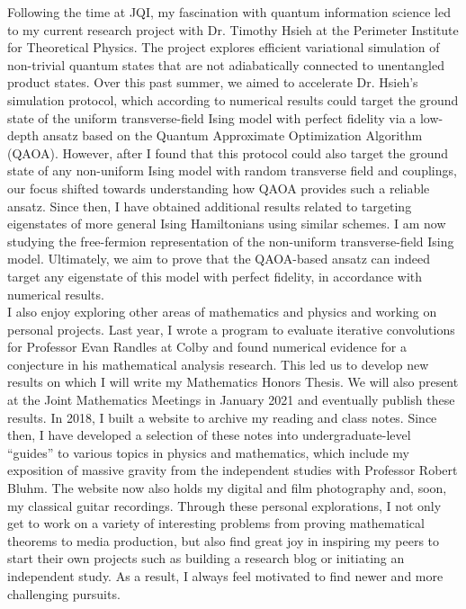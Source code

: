 \documentclass[12pt]{article}
\begin{document}
Following the time at JQI, my fascination with quantum information science led to my current research project with Dr. Timothy Hsieh at the Perimeter Institute for Theoretical Physics. The project explores efficient variational simulation of non-trivial quantum states that are not adiabatically connected to unentangled product states. Over this past summer, we aimed to accelerate Dr. Hsieh's simulation protocol, which according to numerical results could target the ground state of the uniform transverse-field Ising model with perfect fidelity via a low-depth ansatz based on the Quantum Approximate Optimization Algorithm (QAOA). However, after I found that this protocol could also target the ground state of any non-uniform Ising model with random transverse field and couplings, our focus shifted towards understanding how QAOA provides such a reliable ansatz. Since then, I have obtained additional results related to targeting eigenstates of more general Ising Hamiltonians using similar schemes. I am now studying the free-fermion representation of the non-uniform transverse-field Ising model. Ultimately, we aim to prove that the QAOA-based ansatz can indeed target any eigenstate of this model with perfect fidelity, in accordance with numerical results.  \\

I also enjoy exploring other areas of mathematics and physics and working on personal projects. Last year, I wrote a program to evaluate iterative convolutions for Professor Evan Randles at Colby and found numerical evidence for a conjecture in his mathematical analysis research. This led us to develop new results on which I will write my Mathematics Honors Thesis. We will also present at the Joint Mathematics Meetings in January 2021 and eventually publish these results. In 2018, I built a website to archive my reading and class notes. Since then, I have developed a selection of these notes into undergraduate-level ``guides'' to various topics in physics and mathematics, which include my exposition of massive gravity from the independent studies with Professor Robert Bluhm. The website now also holds my digital and film photography and, soon, my classical guitar recordings. Through these personal explorations, I not only get to work on a variety of interesting problems from proving mathematical theorems to media production, but also find great joy in inspiring my peers to start their own projects such as building a research blog or initiating an independent study. As a result, I always feel motivated to find newer and more challenging pursuits. \\
\end{document}
